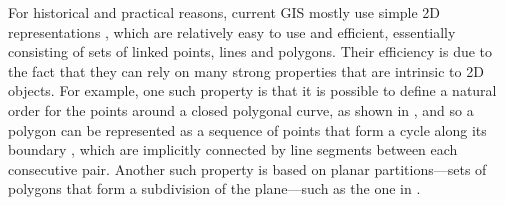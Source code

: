 
For historical and practical reasons, current GIS mostly use simple 2D representations \citep{ESRITopology,SimpleFeatures1}, which are relatively easy to use and efficient, essentially consisting of sets of linked points, lines and polygons.
Their efficiency is due to the fact that they can rely on many strong properties that are intrinsic to 2D objects.
For example, one such property is that it is possible to define a natural order for the points around a closed polygonal curve, as shown in ,
and so a polygon can be represented as a sequence of points that form a cycle along its boundary \citep{Jordan87}, which are implicitly connected by line segments between each consecutive pair.
Another such property is based on planar partitions---sets of polygons that form a subdivision of the plane---such as the one in .
